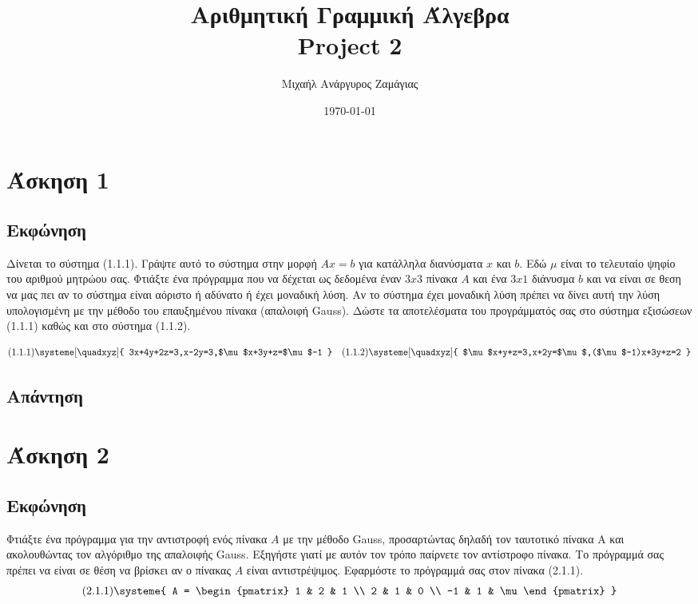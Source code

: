 \documentclass[a4paper,14pt]{extreport}
\begin{document}
\title{Αριθμητική Γραμμική Άλγεβρα\\Project 2}
\author{Μιχαήλ Ανάργυρος Ζαμάγιας}
\date{\today}
\maketitle


\chapter{Άσκηση 1}
\section{Εκφώνηση}

Δίνεται το σύστημα (1.1.1). Γράψτε αυτό το σύστημα στην μορφή $Ax=b$ για κατάλληλα διανύσματα $x$ και $b$. Εδώ $\mu$ είναι το τελευταίο ψηφίο του αριθμού μητρώου σας. Φτιάξτε ένα πρόγραμμα που να δέχεται ως δεδομένα έναν $3x3$ πίνακα $A$ και ένα $3x1$ διάνυσμα $b$ και να είναι σε θεση να μας πει αν το σύστημα είναι αόριστο ή αδύνατο ή έχει μοναδική λύση. Αν το σύστημα έχει μοναδική λύση πρέπει να δίνει αυτή την λύση υπολογισμένη με την μέθοδο του επαυξημένου πίνακα (απαλοιφή Gauss). Δώστε τα αποτελέσματα του προγράμματός σας στο σύστημα εξισώσεων (1.1.1) καθώς και στο σύστημα (1.1.2).

\begin{align*}
    \text{(1.1.1)}\systeme[\quadxyz]{
        3x+4y+2z=3,x-2y=3,$\mu$x+3y+z=$\mu$-1
    }
     &  &
    \text{(1.1.2)}\systeme[\quadxyz]{
        $\mu$x+y+z=3,x+2y=$\mu$,($\mu$-1)x+3y+z=2
    }
\end{align*}

\section{Απάντηση}

\chapter{Άσκηση 2}
\section{Εκφώνηση}

Φτιάξτε ένα πρόγραμμα για την αντιστροφή ενός πίνακα $A$ με την μέθοδο Gauss, προσαρτώντας δηλαδή τον ταυτοτικό πίνακα Α και ακολουθώντας τον αλγόριθμο της απαλοιφής Gauss. Εξηγήστε γιατί με αυτόν τον τρόπο παίρνετε τον αντίστροφο πίνακα. Το πρόγραμμά σας πρέπει να είναι σε θέση να βρίσκει αν ο πίνακας $A$ είναι αντιστρέψιμος. Εφαρμόστε το πρόγραμμά σας στον πίνακα (2.1.1).
\begin{align*}
    \text{(2.1.1)}\systeme{
        A = \begin{pmatrix}
            1  & 2 & 1   \\
            2  & 1 & 0   \\
            -1 & 1 & \mu
        \end{pmatrix}
    }
\end{align*}
\end{document}
